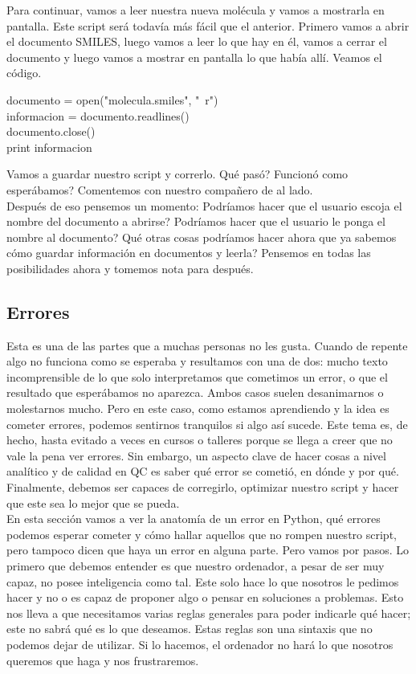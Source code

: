 \documentclass[10pt,letterpaper]{article}
\newenvironment{Code}
{
\begin{lrbox}{\selvestebox}%
\begin{minipage}{\dimexpr\columnwidth-2\fboxsep\relax}
\fontfamily{\ttdefault}\selectfont
}
{\end{minipage}\end{lrbox}%
\begin{center}
\colorbox{light-gray}{\usebox{\selvestebox}}
\end{center}
}
\begin{document}
Para continuar, vamos a leer nuestra nueva mol\'ecula y vamos a mostrarla en pantalla. Este script ser\'a todav\'ia m\'as f\'acil que el anterior. Primero vamos a abrir el documento SMILES, luego vamos a leer lo que hay en \'el, vamos a cerrar el documento y luego vamos a mostrar en pantalla lo que hab\'ia all\'i. Veamos el c\'odigo.

\begin{Code}
documento = open("molecula.smiles", "\ \hspace{-2mm}r")\\
informacion = documento.readlines()\\
documento.close()\\
print informacion
\end{Code}

Vamos a guardar nuestro script y correrlo. Qu\'e pas\'o? Funcion\'o como esper\'abamos? Comentemos con nuestro compa\~nero de al lado.\\

Despu\'es de eso pensemos un momento: Podr\'iamos hacer que el usuario escoja el nombre del documento a abrirse? Podr\'iamos hacer que el usuario le ponga el nombre al documento? Qu\'e otras cosas podr\'iamos hacer ahora que ya sabemos c\'omo guardar informaci\'on en documentos y leerla? Pensemos en todas las posibilidades ahora y tomemos nota para despu\'es.

\subsection{Errores}
Esta es una de las partes que a muchas personas no les gusta. Cuando de repente algo no funciona como se esperaba y resultamos con una de dos: mucho texto incomprensible de lo que solo interpretamos que cometimos un error, o que el resultado que esper\'abamos no aparezca. Ambos casos suelen desanimarnos o molestarnos mucho. Pero en este caso, como estamos aprendiendo y la idea es cometer errores, podemos sentirnos tranquilos si algo as\'i sucede. Este tema es, de hecho, hasta evitado a veces en cursos o talleres porque se llega a creer que no vale la pena ver errores. Sin embargo, un aspecto clave de hacer cosas a nivel anal\'itico y de calidad en QC es saber qu\'e error se cometi\'o, en d\'onde y por qu\'e. Finalmente, debemos ser capaces de corregirlo, optimizar nuestro script y hacer que este sea lo mejor que se pueda.\\

En esta secci\'on vamos a ver la anatom\'ia de un error en Python, qu\'e errores podemos esperar cometer y c\'omo hallar aquellos que no rompen nuestro script, pero tampoco dicen que haya un error en alguna parte. Pero vamos por pasos. Lo primero que debemos entender es que nuestro ordenador, a pesar de ser muy capaz, no posee inteligencia como tal. Este solo hace lo que nosotros le pedimos hacer y no o es capaz de proponer algo o pensar en soluciones a problemas. Esto nos lleva a que necesitamos varias reglas generales para poder indicarle qu\'e hacer; este no sabr\'a qu\'e es lo que deseamos. Estas reglas son una sintaxis que no podemos dejar de utilizar. Si lo hacemos, el ordenador no har\'a lo que nosotros queremos que haga y nos frustraremos.\\
\end{document}
